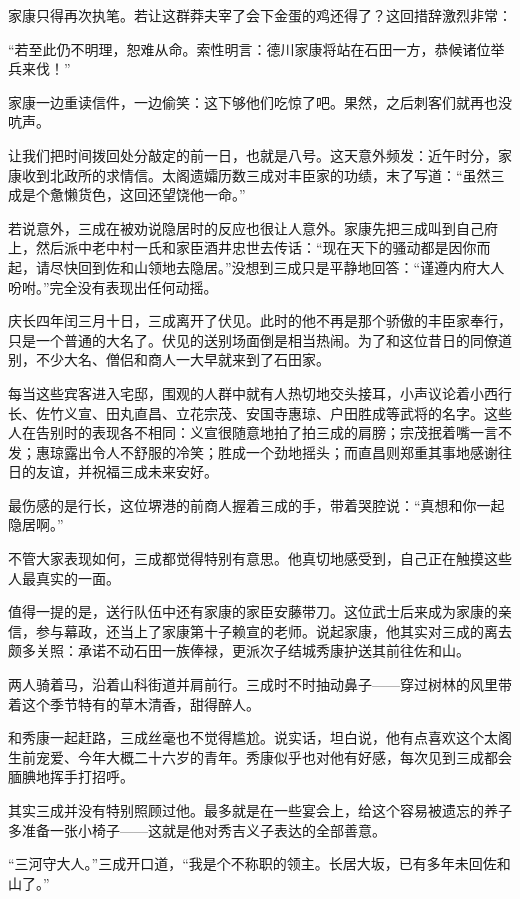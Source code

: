 \documentclass[
]{book}
\begin{document}
家康只得再次执笔。若让这群莽夫宰了会下金蛋的鸡还得了？这回措辞激烈非常：

``若至此仍不明理，恕难从命。索性明言：德川家康将站在石田一方，恭候诸位举兵来伐！''

家康一边重读信件，一边偷笑：这下够他们吃惊了吧。果然，之后刺客们就再也没吭声。

让我们把时间拨回处分敲定的前一日，也就是八号。这天意外频发：近午时分，家康收到北政所的求情信。太阁遗孀历数三成对丰臣家的功绩，末了写道：``虽然三成是个惫懒货色，这回还望饶他一命。''

若说意外，三成在被劝说隐居时的反应也很让人意外。家康先把三成叫到自己府上，然后派中老中村一氏和家臣酒井忠世去传话：``现在天下的骚动都是因你而起，请尽快回到佐和山领地去隐居。''没想到三成只是平静地回答：``谨遵内府大人吩咐。''完全没有表现出任何动摇。

庆长四年闰三月十日，三成离开了伏见。此时的他不再是那个骄傲的丰臣家奉行，只是一个普通的大名了。伏见的送别场面倒是相当热闹。为了和这位昔日的同僚道别，不少大名、僧侣和商人一大早就来到了石田家。

每当这些宾客进入宅邸，围观的人群中就有人热切地交头接耳，小声议论着小西行长、佐竹义宣、田丸直昌、立花宗茂、安国寺惠琼、户田胜成等武将的名字。这些人在告别时的表现各不相同：义宣很随意地拍了拍三成的肩膀；宗茂抿着嘴一言不发；惠琼露出令人不舒服的冷笑；胜成一个劲地摇头；而直昌则郑重其事地感谢往日的友谊，并祝福三成未来安好。

最伤感的是行长，这位堺港的前商人握着三成的手，带着哭腔说：``真想和你一起隐居啊。''

不管大家表现如何，三成都觉得特别有意思。他真切地感受到，自己正在触摸这些人最真实的一面。

值得一提的是，送行队伍中还有家康的家臣安藤带刀。这位武士后来成为家康的亲信，参与幕政，还当上了家康第十子赖宣的老师。说起家康，他其实对三成的离去颇多关照：承诺不动石田一族俸禄，更派次子结城秀康护送其前往佐和山。

两人骑着马，沿着山科街道并肩前行。三成时不时抽动鼻子------穿过树林的风里带着这个季节特有的草木清香，甜得醉人。

和秀康一起赶路，三成丝毫也不觉得尴尬。说实话，坦白说，他有点喜欢这个太阁生前宠爱、今年大概二十六岁的青年。秀康似乎也对他有好感，每次见到三成都会腼腆地挥手打招呼。

其实三成并没有特别照顾过他。最多就是在一些宴会上，给这个容易被遗忘的养子多准备一张小椅子------这就是他对秀吉义子表达的全部善意。

``三河守大人。''三成开口道，``我是个不称职的领主。长居大坂，已有多年未回佐和山了。''
\end{document}
